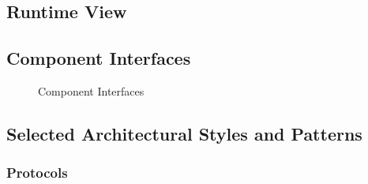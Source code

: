 \documentclass[english]{article}
\begin{document}
\subsection{Runtime View}


\subsection{Component Interfaces}

\begin{figure}[H]
	\centering
	\caption{Component Interfaces}
	\label{compinterfaces}
\end{figure}

\subsection{Selected Architectural Styles and Patterns}


\subsubsection{Protocols}
\end{document}
